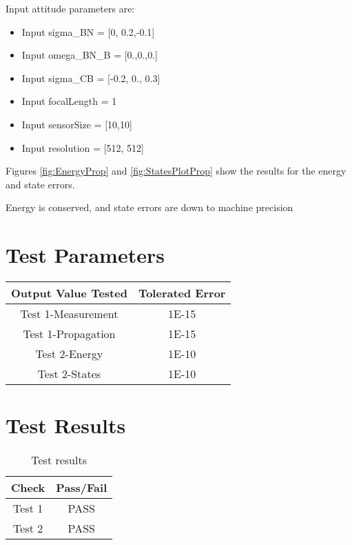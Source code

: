 Input attitude parameters are:
\begin{itemize}
\item Input sigma\_BN = [0, 0.2,-0.1]
\item Input omega\_BN\_B = [0.,0.,0.]
\end{itemize}

\begin{itemize}
    \item Input sigma\_CB = [-0.2, 0., 0.3]
    \item Input focalLength = 1
    \item Input sensorSize = [10,10]
    \item Input resolution = [512, 512]
\end{itemize}

Figures \ref{fig:EnergyProp} and \ref{fig:StatesPlotProp} show the results for the energy and state errors. 
 
 
 
Energy is conserved, and state errors are down to machine precision
  
\section{Test Parameters}

\begin{table}[ht]
\centering
\begin{tabular}{c|c}
\hline
\hline
\textbf{Output Value Tested}     & \textbf{Tolerated Error}  \\ \hline
Test 1-Measurement 	       & 1E-15      		             \\
Test 1-Propagation	               & 1E-15     	                  \\
Test 2-Energy  	                       & 1E-10    		                   \\
Test 2-States  	                       & 1E-10    		                   \\
\end{tabular}
\end{table}

\section{Test Results}

\begin{table}[H]
	\caption{Test results}
	\label{tab:results}
	\centering \fontsize{10}{10}\selectfont
	\begin{tabular}{c | c}
		\hline\hline
		\textbf{Check} 			&\textbf{Pass/Fail} \\ 
		\hline
	   Test 1	   			& PASS \\ 
	   Test 2	   			&PASS \\ 
	   \hline\hline
	\end{tabular}
\end{table}
